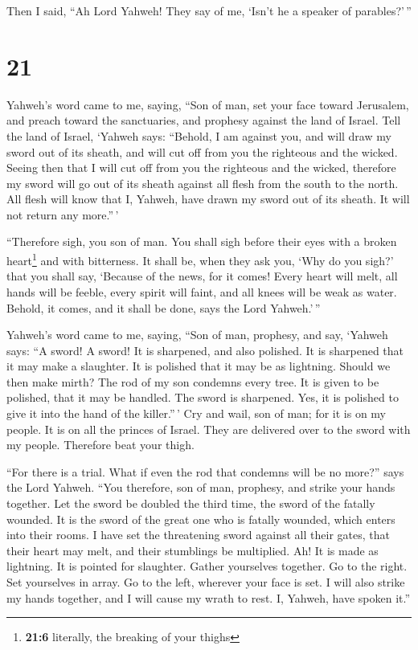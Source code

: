  Then I said, ``Ah Lord Yahweh! They say of me, `Isn't he
a speaker of parables?'\,''

\hypertarget{section-20}{%
\section{21}\label{section-20}}

 Yahweh's word came to me, saying,  ``Son of
man, set your face toward Jerusalem, and preach toward the sanctuaries,
and prophesy against the land of Israel.  Tell the land of
Israel, `Yahweh says: ``Behold, I am against you, and will draw my sword
out of its sheath, and will cut off from you the righteous and the
wicked.  Seeing then that I will cut off from you the
righteous and the wicked, therefore my sword will go out of its sheath
against all flesh from the south to the north.  All flesh
will know that I, Yahweh, have drawn my sword out of its sheath. It will
not return any more.''\,'

 ``Therefore sigh, you son of man. You shall sigh before
their eyes with a broken heart\footnote{\textbf{21:6} literally, the
  breaking of your thighs} and with bitterness.  It shall
be, when they ask you, `Why do you sigh?' that you shall say, `Because
of the news, for it comes! Every heart will melt, all hands will be
feeble, every spirit will faint, and all knees will be weak as water.
Behold, it comes, and it shall be done, says the Lord Yahweh.'\,''

 Yahweh's word came to me, saying,  ``Son of
man, prophesy, and say, `Yahweh says: ``A sword! A sword! It is
sharpened, and also polished.  It is sharpened that it
may make a slaughter. It is polished that it may be as lightning. Should
we then make mirth? The rod of my son condemns every tree.
 It is given to be polished, that it may be handled. The
sword is sharpened. Yes, it is polished to give it into the hand of the
killer.''\,'  Cry and wail, son of man; for it is on my
people. It is on all the princes of Israel. They are delivered over to
the sword with my people. Therefore beat your thigh.

 ``For there is a trial. What if even the rod that
condemns will be no more?'' says the Lord Yahweh.  ``You
therefore, son of man, prophesy, and strike your hands together. Let the
sword be doubled the third time, the sword of the fatally wounded. It is
the sword of the great one who is fatally wounded, which enters into
their rooms.  I have set the threatening sword against
all their gates, that their heart may melt, and their stumblings be
multiplied. Ah! It is made as lightning. It is pointed for slaughter.
 Gather yourselves together. Go to the right. Set
yourselves in array. Go to the left, wherever your face is set.
 I will also strike my hands together, and I will cause
my wrath to rest. I, Yahweh, have spoken it.''


